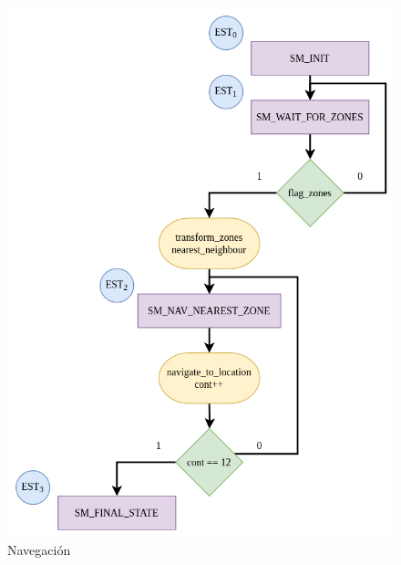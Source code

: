 \begin{figure}[ht]
    \centering
    \includegraphics[scale= 0.4]{Figures/Navigation_CT.png}
        \caption{Navegación}
        \label{fig:ASM_Navigation}
\end{figure}

